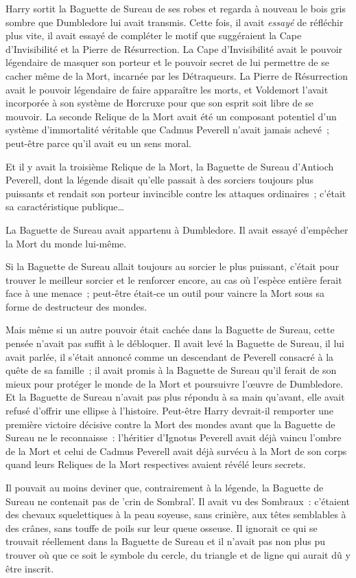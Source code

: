 Harry sortit la Baguette de Sureau de ses robes et regarda à nouveau le bois gris sombre que Dumbledore lui avait transmis. Cette fois, il avait \emph{essayé} de réfléchir plus vite, il avait essayé de compléter le motif que suggéraient la Cape d'Invisibilité et la Pierre de Résurrection. La Cape d'Invisibilité avait le pouvoir légendaire de masquer son porteur et le pouvoir secret de lui permettre de se cacher même de la Mort, incarnée par les Détraqueurs. La Pierre de Résurrection avait le pouvoir légendaire de faire apparaître les morts, et Voldemort l'avait incorporée à son système de Horcruxe pour que son esprit soit libre de se mouvoir. La seconde Relique de la Mort avait été un composant potentiel d'un système d'immortalité véritable que Cadmus Peverell n'avait jamais achevé~; peut-être parce qu'il avait eu un sens moral.

Et il y avait la troisième Relique de la Mort, la Baguette de Sureau d'Antioch Peverell, dont la légende disait qu'elle passait à des sorciers toujours plus puissants et rendait son porteur invincible contre les attaques ordinaires~; c'était sa caractéristique publique…

La Baguette de Sureau avait appartenu à Dumbledore. Il avait essayé d'empêcher la Mort du monde lui-même.

Si la Baguette de Sureau allait toujours au sorcier le plus puissant, c'était pour trouver le meilleur sorcier et le renforcer encore, au cas où l'espèce entière ferait face à une menace~; peut-être était-ce un outil pour vaincre la Mort sous sa forme de destructeur des mondes.

Mais même si un autre pouvoir était cachée dans la Baguette de Sureau, cette pensée n'avait pas suffit à le débloquer. Il avait levé la Baguette de Sureau, il lui avait parlée, il s'était annoncé comme un descendant de Peverell consacré à la quête de sa famille~; il avait promis à la Baguette de Sureau qu'il ferait de son mieux pour protéger le monde de la Mort et poursuivre l'œuvre de Dumbledore. Et la Baguette de Sureau n'avait pas plus répondu à sa main qu'avant, elle avait refusé d'offrir une ellipse à l'histoire. Peut-être Harry devrait-il remporter une première victoire décisive contre la Mort des mondes avant que la Baguette de Sureau ne le reconnaisse~: l'héritier d'Ignotus Peverell avait déjà vaincu l'ombre de la Mort et celui de Cadmus Peverell avait déjà survécu à la Mort de son corps quand leurs Reliques de la Mort respectives avaient révélé leurs secrets.

Il pouvait au moins deviner que, contrairement à la légende, la Baguette de Sureau ne contenait pas de 'crin de Sombral'. Il avait vu des Sombraux~: c'étaient des chevaux squelettiques à la peau soyeuse, sans crinière, aux têtes semblables à des crânes, sans touffe de poils sur leur queue osseuse. Il ignorait ce qui se trouvait réellement dans la Baguette de Sureau et il n'avait pas non plus pu trouver où que ce soit le symbole du cercle, du triangle et de ligne qui aurait dû y être inscrit.

